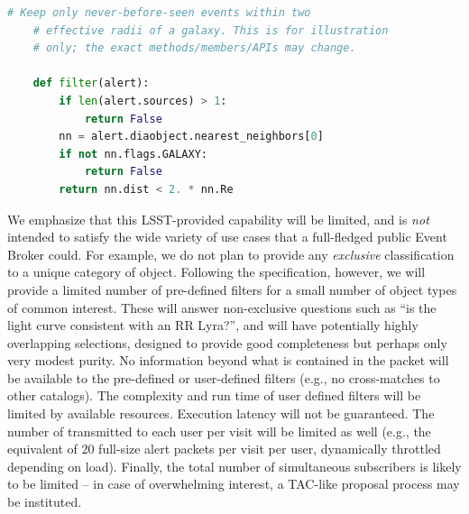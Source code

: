 \begin{lstlisting}[language=python,commentstyle=\bfseries\color{green!40!black}]
    # Keep only never-before-seen events within two
    # effective radii of a galaxy. This is for illustration
    # only; the exact methods/members/APIs may change.

    def filter(alert):
        if len(alert.sources) > 1:
            return False
        nn = alert.diaobject.nearest_neighbors[0]
        if not nn.flags.GALAXY:
            return False
        return nn.dist < 2. * nn.Re
\end{lstlisting}


We emphasize that this LSST-provided capability will be limited, and is \emph{not} intended to satisfy the wide variety of use cases that a full-fledged public Event Broker could.
For example, we do not plan to provide any \emph{exclusive} classification to a unique category of object.
Following the \SRD specification, however, we will provide a limited number of pre-defined filters for a small number of object types of common interest.
These will answer non-exclusive questions such as ``is the light curve consistent with an RR Lyra?'', and will have potentially highly overlapping selections, designed to provide good completeness but perhaps only very modest purity.
No information beyond what is contained in the \VOEvent packet will be available to the pre-defined or user-defined filters (e.g., no cross-matches to other catalogs).
The complexity and run time of user defined filters will be limited by available resources.
Execution latency will not be guaranteed.
The number of \VOEvents transmitted to each user per visit will be limited as well (e.g., the equivalent of 20 full-size alert packets per visit per user, dynamically throttled depending on load).
Finally, the total number of simultaneous subscribers is likely to be limited -- in case of overwhelming interest, a TAC-like proposal process may be instituted.

